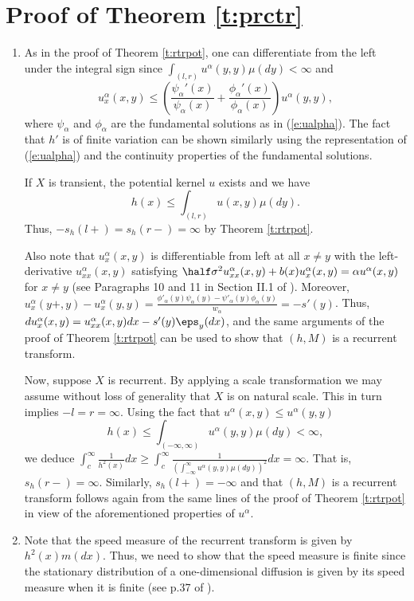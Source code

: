 \documentclass[11pt,reqno]{amsart}
\numberwithin{equation}{section}
\begin{document}
\section{Proof of Theorem \ref{t:prctr}}
	\begin{enumerate}[leftmargin=*]
		\item As in the proof of Theorem \ref{t:rtrpot}, one can differentiate from the left under the integral sign since $\int_{(l,r)} u^{\alpha}(y,y)\mu(dy)<\infty$ and
		\[
		u^{\alpha}_x(x,y)\leq \left(\frac{\psi_{\alpha}'(x)}{\psi_{\alpha}(x)}+\frac{\phi_{\alpha}'(x)}{\phi_{\alpha}(x)}\right)u^{\alpha}(y,y),
		\]
		where $\psi_{\alpha}$ and $\phi_{\alpha}$ are the fundamental solutions as in (\ref{e:ualpha}). The fact that $h'$ is of finite variation can be shown similarly using the representation of (\ref{e:ualpha}) and the continuity properties of the fundamental solutions.
		
		If $X$ is transient, the potential kernel $u$ exists and we have
		\[
		h(x)\leq  \int_{(l,r)} u(x,y)\mu(dy).
		\]
		Thus, $-s_h(l+)=s_h(r-)=\infty$ by Theorem \ref{t:rtrpot}.
		
		Also note that  $u^{\alpha}_x(x,y)$ is differentiable from left at all $x \neq y$ with the left-derivative $u_{xx}^{\alpha}(x,y)$ satisfying $\half \sigma^2 u^{\alpha}_{xx}(x,y)+ b(x)u^{\alpha}_x(x,y)=\alpha u^{\alpha}(x,y)$ for $x \neq y$ (see Paragraphs 10 and 11 in Section II.1 of \cite{BorSal}).
		Moreover, $u^{\alpha}_x(y+,y)-u^{\alpha}_x(y,y)=\frac{\phi'_{\alpha}(y)\psi_{\alpha}(y)-\psi'_{\alpha}(y)\phi_{\alpha}(y)}{w_{\alpha}}=-s'(y)$. 
		Thus, $du^{\alpha}_x(x,y)=u^{\alpha}_{xx}(x,y)dx-s'(y)\eps_y(dx)$, and the same arguments  of the proof of Theorem \ref{t:rtrpot}  can be used to show that $(h,M)$ is a recurrent transform. 
		
		Now, suppose $X$ is recurrent. By applying a scale transformation we may assume without loss of generality that $X$ is on natural scale. This in turn implies $-l=r=\infty$. Using the fact that $u^{\alpha}(x,y)\leq u^{\alpha}(y,y)$ 
		\[
		h(x)\leq \int_{(-\infty,\infty)}u^{\alpha}(y,y)\mu(dy)<\infty,
		\]
		we deduce $\int_c^{\infty}\frac{1}{h^2(x)}dx\geq \int_c^{\infty}\frac{1}{ (\int_{-\infty}^{\infty}u^{\alpha}(y,y)\mu(dy))^2}dx=\infty$. That is, $s_h(r-)=\infty$. Similarly, $s_h(l+)=-\infty$ and that $(h,M)$ is a recurrent transform follows again from the same lines of the proof of Theorem  \ref{t:rtrpot} in view of the aforementioned properties of $u^{\alpha}$.
		
		\item Note that the speed measure of the recurrent transform is given by $h^2(x)m(dx)$. Thus, we need to show that the speed measure is finite 	since the stationary distribution of a one-dimensional diffusion is given by its speed measure when it is finite (see p.37 of \cite{BorSal}).
		

\end{enumerate}
\end{document}
